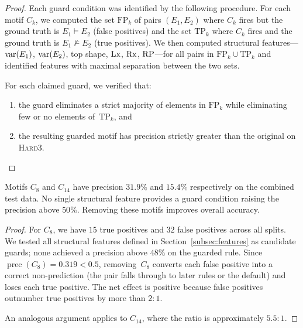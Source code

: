 \begin{proof}
Each guard condition was identified by the following procedure.
For each motif $C_k$, we computed the set $\mathrm{FP}_k$ of pairs
$(E_1, E_2)$ where $C_k$ fires but the ground truth is
$E_1 \models E_2$ (false positives) and the set $\mathrm{TP}_k$
where $C_k$ fires and the ground truth is $E_1 \not\models E_2$
(true positives).  We then computed structural features---$\operatorname{var}(E_1)$,
$\operatorname{var}(E_2)$, top shape, $\operatorname{Lx}$, $\operatorname{Rx}$, $\operatorname{RP}$---for all pairs in
$\mathrm{FP}_k \cup \mathrm{TP}_k$ and identified features with
maximal separation between the two sets.

For each claimed guard, we verified that:
\begin{enumerate}[label=(\alph*)]
\item the guard eliminates a strict majority of elements in
  $\mathrm{FP}_k$ while eliminating few or no elements
  of~$\mathrm{TP}_k$, and
\item the resulting guarded motif has precision strictly greater
  than the original on \textsc{Hard3}.\qedhere
\end{enumerate}
\end{proof}

\begin{proposition}\label{prop:motif-removal}
Motifs $C_8$ and $C_{14}$ have precision $31.9\%$ and $15.4\%$
respectively on the combined test data.  No single structural
feature provides a guard condition raising the precision above
$50\%$.  Removing these motifs improves overall accuracy.
\end{proposition}

\begin{proof}
For $C_8$, we have $15$ true positives and $32$ false positives
across all splits.  We tested all structural features defined in
Section~\ref{subsec:features} as candidate guards; none achieved
a precision above $48\%$ on the guarded rule.  Since
$\operatorname{prec}(C_8) = 0.319 < 0.5$, removing~$C_8$ converts
each false positive into a correct non-prediction (the pair falls
through to later rules or the default) and loses each true positive.
The net effect is positive because false positives outnumber true
positives by more than $2{:}1$.

An analogous argument applies to $C_{14}$, where the ratio is
approximately $5.5{:}1$.
\end{proof}

